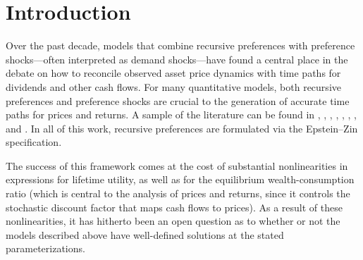 \documentclass[12pt, reqno]{amsart}
\newcommand{\1}{\mathbbm 1}
\theoremstyle{plain}
\theoremstyle{definition}
\begin{document}
\maketitle

\pagebreak
\section{Introduction}

Over the past decade, models that combine recursive preferences with
preference shocks---often interpreted as demand shocks---have found a central
place in the debate on how to reconcile observed asset price dynamics with
time paths for dividends and other cash flows.  For many quantitative models,
both recursive preferences and preference shocks are crucial to the generation of
accurate time paths for prices and returns.  A sample of the literature can be
found in \cite{Albuquerque2016}, \cite{basu2017uncertainty},
\cite{schorfheide2018identifying}, \cite{chen2019search},
\cite{GomezYaron2020}, \cite{deGroot2018}, \cite{creal2020bond}, and
\cite{degroot2021valuation}.  In all of this work, recursive preferences are
formulated via the Epstein--Zin specification.

The success of this framework comes at the cost of substantial nonlinearities
in expressions for lifetime utility, as well as for the equilibrium
wealth-consumption ratio (which is central to the analysis of prices and
returns, since it controls the stochastic discount factor that maps cash flows
to prices).  As a result of these nonlinearities, it has hitherto been an open
question as to whether or not the models described above have well-defined
solutions at the stated parameterizations.

\end{document}
